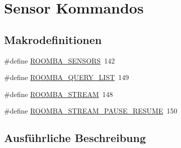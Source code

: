 \hypertarget{group__roomba__commands__sensor}{\section{Sensor Kommandos}
\label{group__roomba__commands__sensor}
}
\subsection*{Makrodefinitionen}
\begin{DoxyCompactItemize}
\item 
\#define \hyperlink{group__roomba__commands__sensor_gaef0d27b1b9b49c6aaa0a7241e7e41201}{R\-O\-O\-M\-B\-A\-\_\-\-S\-E\-N\-S\-O\-R\-S}~142
\item 
\#define \hyperlink{group__roomba__commands__sensor_gaa4ae696773b751ed0b4828ebe3861d69}{R\-O\-O\-M\-B\-A\-\_\-\-Q\-U\-E\-R\-Y\-\_\-\-L\-I\-S\-T}~149
\item 
\#define \hyperlink{group__roomba__commands__sensor_gafc6423e54083bd2b1abc99198bbbf739}{R\-O\-O\-M\-B\-A\-\_\-\-S\-T\-R\-E\-A\-M}~148
\item 
\#define \hyperlink{group__roomba__commands__sensor_ga6389061ebdb4feec1198ea5c4f6fae55}{R\-O\-O\-M\-B\-A\-\_\-\-S\-T\-R\-E\-A\-M\-\_\-\-P\-A\-U\-S\-E\-\_\-\-R\-E\-S\-U\-M\-E}~150
\end{DoxyCompactItemize}


\subsection{Ausführliche Beschreibung}


